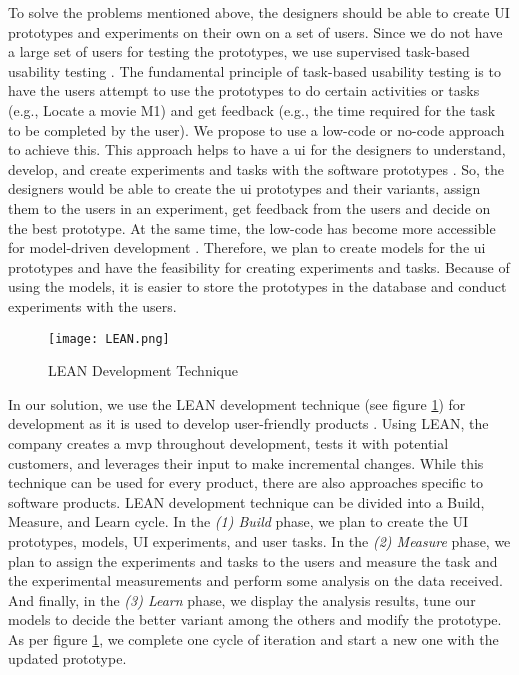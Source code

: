 To solve the problems mentioned above, the designers should be able to create UI prototypes and experiments on their own on a set of users.
Since we do not have a large set of users for testing the prototypes, we use supervised task-based usability testing \cite{article:dataanalysis:supervisedtest}.
The fundamental principle of task-based usability testing is to have the users attempt to use the prototypes to do certain activities or tasks (e.g., Locate a movie M1) and get feedback (e.g., the time required for the task to be completed by the user).
We propose to use a low-code or no-code approach to achieve this.
This approach helps to have a \ac{ui} for the designers to understand, develop, and create experiments and tasks with the software prototypes \cite{paper:lowcode:khorram}.
So, the designers would be able to create the \ac{ui} prototypes and their variants, assign them to the users in an experiment, get feedback from the users and decide on the best prototype.
At the same time, the low-code has become more accessible for model-driven development \cite{article:lowcode:modeldriven}.
Therefore, we plan to create models for the \ac{ui} prototypes and have the feasibility for creating experiments and tasks. 
Because of using the models, it is easier to store the prototypes in the database and conduct experiments with the users. 

\begin{figure}[ht]
    \centering
    \texttt{[image: LEAN.png]}
    \caption{LEAN Development Technique}
    \label{intro:fig:lean}
\end{figure}

In our solution, we use the LEAN development technique (see figure \ref{intro:fig:lean}) for development as it is used to develop user-friendly products \cite{article:lean:hart}.
Using LEAN, the company creates a \ac{mvp} throughout development, tests it with potential customers, and leverages their input to make incremental changes.
While this technique can be used for every product, there are also approaches specific to software products.
LEAN development technique can be divided into a Build, Measure, and Learn cycle. 
In the \textit{(1) Build} phase, we plan to create the UI prototypes, models, UI experiments, and user tasks.
In the \textit{(2) Measure} phase, we plan to assign the experiments and tasks to the users and measure the task and the experimental measurements and perform some analysis on the data received. 
And finally, in the \textit{(3) Learn} phase, we display the analysis results, tune our models to decide the better variant among the others and modify the prototype.
As per figure \ref{intro:fig:lean}, we complete one cycle of iteration and start a new one with the updated prototype.

